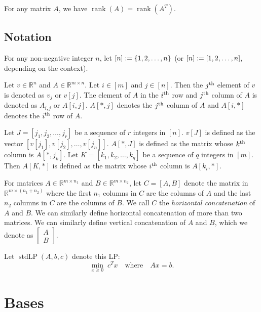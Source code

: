\documentclass[a4paper, 12pt, fleqn]{article}
\DeclareMathOperator{\rank}{rank}
\DeclareMathOperator{\stdLP}{stdLP}
\newenvironment*{inLongVersion}{}{}
\begin{document}
\begin{inLongVersion}
\begin{lemma}
For any matrix $A$, we have $\rank(A) = \rank(A^T)$.
\end{lemma}
\end{inLongVersion}

\subsection{Notation}

For any non-negative integer $n$, let $[n] := \{1, 2, \ldots, n\}$
(or $[n] := [1, 2, \ldots, n]$, depending on the context).

\begin{inLongVersion}
Let $v \in \mathbb{R}^n$ and $A \in \mathbb{R}^{m \times n}$.
Let $i \in [m]$ and $j \in [n]$.
Then the $j^{\textrm{th}}$ element of $v$ is denoted as $v_j$ or $v[j]$.
The element of $A$ in the $i^{\textrm{th}}$ row and $j^{\textrm{th}}$ column of $A$ is denoted as
$A_{i,j}$ or $A[i,j]$. $A[*,j]$ denotes the $j^{\textrm{th}}$ column of $A$ and
$A[i, *]$ denotes the $i^{\textrm{th}}$ row of $A$.

Let $J = [j_1, j_2, \ldots, j_r]$ be a sequence of $r$ integers in $[n]$.
$v[J]$ is defined as the vector $[v[j_1], v[j_2], \ldots, v[j_n]]$.
$A[*,J]$ is defined as the matrix whose $k^{\textrm{th}}$ column is $A[*,j_k]$.
Let $K = [k_1, k_2, \ldots, k_q]$ be a sequence of $q$ integers in $[m]$.
Then $A[K,*]$ is defined as the matrix whose $i^{\textrm{th}}$ column is $A[k_i,*]$.

For matrices $A \in \mathbb{R}^{m \times n_1}$ and $B \in \mathbb{R}^{m \times n_2}$,
let $C = [A, B]$ denote the matrix in $\mathbb{R}^{m \times (n_1 + n_2)}$
where the first $n_1$ columns in $C$ are the columns of $A$
and the last $n_2$ columns in $C$ are the columns of $B$.
We call $C$ the \emph{horizontal concatenation} of $A$ and $B$.
We can similarly define horizontal concatenation of more than two matrices.
We can similarly define vertical concatenation of $A$ and $B$,
which we denote as $\begin{bmatrix}A\\B\end{bmatrix}$.
\end{inLongVersion}

\begin{definition}
Let $\stdLP(A, b, c)$ denote this LP:
\[ \min_{x \ge 0}\; c^Tx \quad\textrm{where}\quad Ax = b. \]
\end{definition}

\section{Bases}
\end{document}
